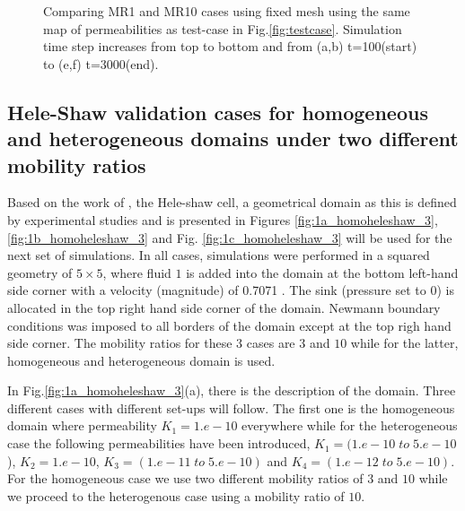 \documentclass[preprint,authoryear,12pt]{elsarticle}
\begin{document}
\begin{figure}[h]
{{}%
\hfill    
{}}%
\caption{Comparing MR1 and MR10 cases using fixed mesh using the same map of permeabilities as test-case in Fig.\ref{fig:testcase}. Simulation time step increases from top to bottom and from (a,b) t=100(start) to (e,f) t=3000(end).}
\label{fig:1testcase}
\end{figure}


\subsection{Hele-Shaw validation cases for homogeneous and heterogeneous domains under two different mobility ratios}

\medskip
Based on the work of \citet{saffman_1986}, the Hele-shaw cell, a geometrical domain as this is defined by experimental studies and is presented in Figures \ref{fig:1a_homoheleshaw_3}, \ref{fig:1b_homoheleshaw_3} and Fig. \ref{fig:1c_homoheleshaw_3} will be used for the next set of simulations. In all cases, simulations were performed in a squared geometry of $5\times5$, where fluid $1$ is added into the domain at the bottom left-hand side corner with a velocity (magnitude) of 0.7071 %
. The sink (pressure set to $0$) is allocated in the top right hand side corner of the domain. Newmann boundary conditions %
was imposed to all borders of the domain except at the top righ hand side corner. The mobility ratios for these $3$ cases are $3$ and $10$ while for the latter, homogeneous and heterogeneous domain is used.

\medskip
In Fig.\ref{fig:1a_homoheleshaw_3}(a), there is the description of the domain. Three different cases with different set-ups will follow. The first one is the homogeneous domain where permeability $K_{1}=1.e-10$ everywhere while for the heterogeneous case the following permeabilities have been introduced, $K_{1}=(1.e-10 \;to\; 5.e-10$), $K_{2}=1.e-10$, $K_{3}=(1.e-11 \;to\; 5.e-10)$ and $K_{4}=(1.e-12 \;to\; 5.e-10)$. For the homogeneous case we use two different mobility ratios of $3$ and $10$ while we proceed to the heterogenous case using a mobility ratio of $10$. 
\end{document}
